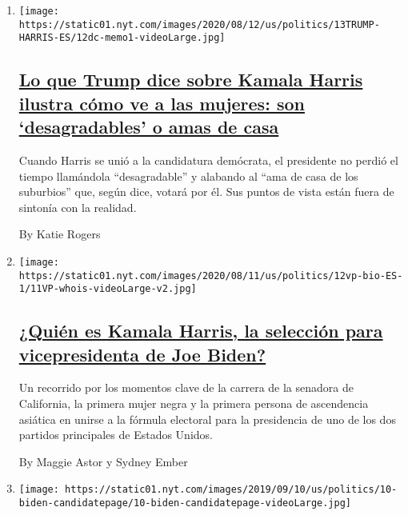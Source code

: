 \begin{enumerate}
\def\labelenumi{\arabic{enumi}.}
\item
  \texttt{[image: https://static01.nyt.com/images/2020/08/12/us/politics/13TRUMP-HARRIS-ES/12dc-memo1-videoLarge.jpg]}

  \hypertarget{lo-que-trump-dice-sobre-kamala-harris-ilustra-cuxf3mo-ve-a-las-mujeres-son-desagradables-o-amas-de-casa}{%
  \subsection{\texorpdfstring{\href{/es/2020/08/14/espanol/mundo/trump-kamala-harris.html}{Lo
  que Trump dice sobre Kamala Harris ilustra cómo ve a las mujeres: son
  `desagradables' o amas de
  casa}}{Lo que Trump dice sobre Kamala Harris ilustra cómo ve a las mujeres: son `desagradables' o amas de casa}}\label{lo-que-trump-dice-sobre-kamala-harris-ilustra-cuxf3mo-ve-a-las-mujeres-son-desagradables-o-amas-de-casa}}

  Cuando Harris se unió a la candidatura demócrata, el presidente no
  perdió el tiempo llamándola ``desagradable'' y alabando al ``ama de
  casa de los suburbios'' que, según dice, votará por él. Sus puntos de
  vista están fuera de sintonía con la realidad.

  By Katie Rogers
\item
  \texttt{[image: https://static01.nyt.com/images/2020/08/11/us/politics/12vp-bio-ES-1/11VP-whois-videoLarge-v2.jpg]}

  \hypertarget{quiuxe9n-es-kamala-harris-la-selecciuxf3n-para-vicepresidenta-de-joe-biden}{%
  \subsection{\texorpdfstring{\href{/es/2020/08/12/espanol/estados-unidos/quien-es-kamala-harris-vicepresidenta.html}{¿Quién
  es Kamala Harris, la selección para vicepresidenta de Joe
  Biden?}}{¿Quién es Kamala Harris, la selección para vicepresidenta de Joe Biden?}}\label{quiuxe9n-es-kamala-harris-la-selecciuxf3n-para-vicepresidenta-de-joe-biden}}

  Un recorrido por los momentos clave de la carrera de la senadora de
  California, la primera mujer negra y la primera persona de ascendencia
  asiática en unirse a la fórmula electoral para la presidencia de uno
  de los dos partidos principales de Estados Unidos.

  By Maggie Astor y Sydney Ember
\item
  \texttt{[image: https://static01.nyt.com/images/2019/09/10/us/politics/10-biden-candidatepage/10-biden-candidatepage-videoLarge.jpg]}


\end{enumerate}

